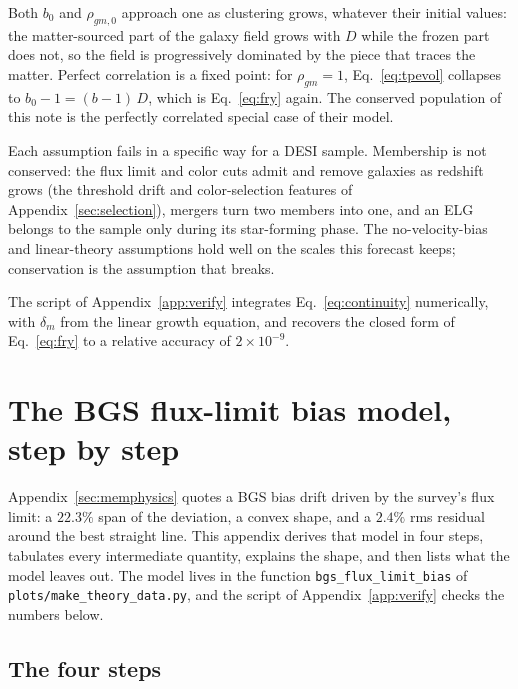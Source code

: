 \documentclass[11pt]{article}
\begin{document}
Both $b_0$ and $\rho_{gm,0}$ approach one as clustering grows, whatever
their initial values: the matter-sourced part of the galaxy field
grows with $D$ while the frozen part does not, so the field is
progressively dominated by the piece that traces the matter.
Perfect correlation is a fixed point: for $\rho_{gm} = 1$,
Eq.~\eqref{eq:tpevol} collapses to $b_0 - 1 = (b - 1)\,D$, which is
Eq.~\eqref{eq:fry} again.  The conserved population of this note is
the perfectly correlated special case of their model.

Each assumption fails in a specific way for a DESI sample.
Membership is not conserved: the flux limit and color cuts admit and
remove galaxies as redshift grows (the threshold drift and
color-selection features of Appendix~\ref{sec:selection}), mergers
turn two members into one, and an ELG belongs to the sample only
during its star-forming phase.  The no-velocity-bias and
linear-theory assumptions hold well on the scales this forecast
keeps; conservation is the assumption that breaks.

The script of Appendix~\ref{app:verify} integrates
Eq.~\eqref{eq:continuity} numerically, with $\delta_m$ from the
linear growth equation, and recovers the closed form of
Eq.~\eqref{eq:fry} to a relative accuracy of $2 \times 10^{-9}$.

\section{The BGS flux-limit bias model, step by step}
\label{app:bgsflux}

Appendix~\ref{sec:memphysics} quotes a BGS bias drift driven by the
survey's flux limit: a $22.3\%$ span of the deviation, a convex
shape, and a $2.4\%$ rms residual around the best straight line.
This appendix derives that model in four steps, tabulates every
intermediate quantity, explains the shape, and then lists what the
model leaves out.  The model lives in the function
\texttt{bgs\_flux\_limit\_bias} of
\texttt{plots/make\_theory\_data.py}, and the script of
Appendix~\ref{app:verify} checks the numbers below.

\subsection{The four steps}
\label{sec:bgssteps}
\end{document}
